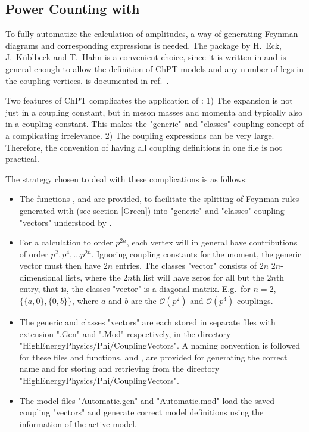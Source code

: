\subsection{Power Counting with \fa}

To fully automatize the calculation of amplitudes, a way of generating Feynman diagrams and
corresponding expressions  is needed. The package \fa by H.~Eck, J.~K\"ublbeck and T.~Hahn
is a convenient choice, since it is written in \mma
and is general enough to allow the definition of ChPT models and any number of legs in the
coupling vertices. \fa is documented in ref.~.

Two features of ChPT complicates the application of \fa:
1) The expansion is not just in a coupling constant, but in meson masses and momenta and
typically also in a coupling constant.
This makes the "generic" and "classes" coupling concept of \fa a complicating irrelevance.
2) The coupling expressions can be very large. Therefore, the \fa convention of having all
coupling definitions in one file is not practical.

The strategy chosen to deal with these complications is as follows:
\begin{itemize}
\item The functions ,  and 
are provided, to facilitate the splitting of Feynman rules generated with
 (see section \ref{Green}) into "generic" and "classes" coupling "vectors"
understood by \fa.
\item For a calculation to order $p^{2 n}$, each vertex will in general have contributions of
order $p^2, p^4, ... p^{2 n}$. Ignoring coupling constants for the moment, the generic vector must
then have $2 n$ entries. The classes "vector" consists of $2 n$ $2 n$-dimensional lists,
where the $2 n$th list will have zeros for all but the $2 n$th entry, that is, the classes
"vector" is a diagonal matrix. E.g.~for $n=2$, $\{\{a,0\},\{0,b\}\}$, where $a$ and $b$ are the
$\mathscr{O}(p^2)$ and $\mathscr{O}(p^4)$ couplings.
\item The generic and classes "vectors" are each stored in separate files with extension
".Gen" and ".Mod" respectively, in the directory "HighEnergyPhysics/Phi/CouplingVectors".
A naming convention is followed for these files and
functions,  and  , are provided for generating the correct name
and for storing and retrieving from the directory "HighEnergyPhysics/Phi/CouplingVectors".
\item The \fa model files "Automatic.gen" and "Automatic.mod" load the saved coupling "vectors"
and generate correct \fa model definitions using the information of the active \fphi model.
\end{itemize}

